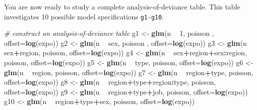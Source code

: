 \documentclass[
]{book}
\newenvironment{Shaded}{\begin{snugshade}}{\end{snugshade}}
\newcommand{\CommentTok}[1]{\textcolor[rgb]{0.56,0.35,0.01}{\textit{#1}}}
\newcommand{\DataTypeTok}[1]{\textcolor[rgb]{0.13,0.29,0.53}{#1}}
\newcommand{\DecValTok}[1]{\textcolor[rgb]{0.00,0.00,0.81}{#1}}
\newcommand{\KeywordTok}[1]{\textcolor[rgb]{0.13,0.29,0.53}{\textbf{#1}}}
\newcommand{\NormalTok}[1]{#1}
\newcommand{\OperatorTok}[1]{\textcolor[rgb]{0.81,0.36,0.00}{\textbf{#1}}}
\newcommand{\StringTok}[1]{\textcolor[rgb]{0.31,0.60,0.02}{#1}}
\begin{document}
You are now ready to study a complete analysis-of-deviance table. This table investigates 10 possible model specifications \texttt{g1-g10}.

\begin{Shaded}
\begin{Highlighting}[]
\CommentTok{# construct an analysis-of-deviance table}
\NormalTok{g1 <-}\StringTok{ }\KeywordTok{glm}\NormalTok{(n }\OperatorTok{~}\StringTok{ }\DecValTok{1}\NormalTok{, poisson , }\DataTypeTok{offset=}\KeywordTok{log}\NormalTok{(expo))}
\NormalTok{g2 <-}\StringTok{ }\KeywordTok{glm}\NormalTok{(n }\OperatorTok{~}\StringTok{ }\NormalTok{sex, poisson , }\DataTypeTok{offset=}\KeywordTok{log}\NormalTok{(expo))}
\NormalTok{g3 <-}\StringTok{ }\KeywordTok{glm}\NormalTok{(n }\OperatorTok{~}\StringTok{ }\NormalTok{sex}\OperatorTok{+}\NormalTok{region, poisson, }\DataTypeTok{offset=}\KeywordTok{log}\NormalTok{(expo))}
\NormalTok{g4 <-}\StringTok{ }\KeywordTok{glm}\NormalTok{(n }\OperatorTok{~}\StringTok{ }\NormalTok{sex}\OperatorTok{+}\NormalTok{region}\OperatorTok{+}\NormalTok{sex}\OperatorTok{:}\NormalTok{region, poisson, }\DataTypeTok{offset=}\KeywordTok{log}\NormalTok{(expo))}
\NormalTok{g5 <-}\StringTok{ }\KeywordTok{glm}\NormalTok{(n }\OperatorTok{~}\StringTok{ }\NormalTok{type, poisson, }\DataTypeTok{offset=}\KeywordTok{log}\NormalTok{(expo))}
\NormalTok{g6 <-}\StringTok{ }\KeywordTok{glm}\NormalTok{(n }\OperatorTok{~}\StringTok{ }\NormalTok{region, poisson, }\DataTypeTok{offset=}\KeywordTok{log}\NormalTok{(expo))}
\NormalTok{g7 <-}\StringTok{ }\KeywordTok{glm}\NormalTok{(n }\OperatorTok{~}\StringTok{ }\NormalTok{region}\OperatorTok{+}\NormalTok{type, poisson, }\DataTypeTok{offset=}\KeywordTok{log}\NormalTok{(expo))}
\NormalTok{g8 <-}\StringTok{ }\KeywordTok{glm}\NormalTok{(n }\OperatorTok{~}\StringTok{ }\NormalTok{region}\OperatorTok{+}\NormalTok{type}\OperatorTok{+}\NormalTok{region}\OperatorTok{:}\NormalTok{type, poisson, }\DataTypeTok{offset=}\KeywordTok{log}\NormalTok{(expo))}
\NormalTok{g9 <-}\StringTok{ }\KeywordTok{glm}\NormalTok{(n }\OperatorTok{~}\StringTok{ }\NormalTok{region}\OperatorTok{+}\NormalTok{type}\OperatorTok{+}\NormalTok{job, poisson, }\DataTypeTok{offset=}\KeywordTok{log}\NormalTok{(expo))}
\NormalTok{g10 <-}\StringTok{ }\KeywordTok{glm}\NormalTok{(n }\OperatorTok{~}\StringTok{ }\NormalTok{region}\OperatorTok{+}\NormalTok{type}\OperatorTok{+}\NormalTok{sex, poisson, }\DataTypeTok{offset=}\KeywordTok{log}\NormalTok{(expo))}
\end{Highlighting}
\end{Shaded}
\end{document}
